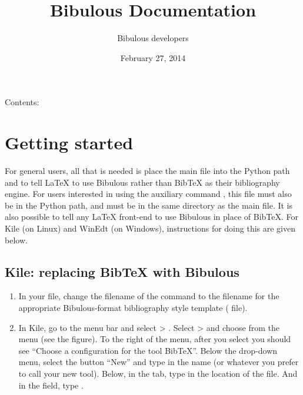 \documentclass[letterpaper,10pt,english]{sphinxmanual}
\title{Bibulous Documentation}
\date{February 27, 2014}
\author{Bibulous developers}
\begin{document}
\maketitle
\tableofcontents
{}\label{index::doc}


Contents:


\chapter{Getting started}
\label{getting_started:bibulous-documentation}\label{getting_started:getting-started}\label{getting_started::doc}
For general users, all that is needed is place the main  file into the Python path and to tell LaTeX to use Bibulous rather than BibTeX as their bibliography engine. For users interested in using the auxiliary command , this file must also be in the Python path, and must be in the same directory as the main file. It is also possible to tell any LaTeX front-end to use Bibulous in place of BibTeX. For Kile (on Linux) and WinEdt (on Windows), instructions for doing this are given below.


\section{Kile: replacing BibTeX with Bibulous}
\label{getting_started:kile-replacing-bibtex-with-bibulous}\begin{enumerate}
\item {} 
In your  file, change the filename of the  command to the filename for the appropriate Bibulous-format bibliography style template ( file).

\item {} 
In Kile, go to the menu bar and select  \textgreater{} . Select  \textgreater{}  and choose  from the  menu (see the figure). To the right of the menu, after you select  you should see ``Choose a configuration for the tool BibTeX''. Below the drop-down menu, select the button ``New'' and type in the name  (or whatever you prefer to call your new tool). Below, in the  tab, type in the location of the  file. And in the  field, type .

\end{enumerate}
\end{document}

